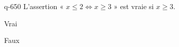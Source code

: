 \begin{truefalse}{q-650}
L'assertion « $x\leq 2 \Leftrightarrow x \geq 3$ » est vraie si $x\geq 3$.
\item Vrai
\item* Faux
\end{truefalse}

